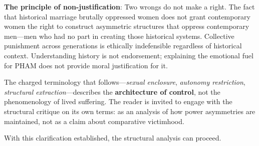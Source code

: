 \documentclass[12pt, letterpaper]{article}
\begin{document}
\textbf{The principle of non-justification}: Two wrongs do not make a right. The fact that historical marriage brutally oppressed women does not grant contemporary women the right to construct asymmetric structures that oppress contemporary men---men who had no part in creating those historical systems. Collective punishment across generations is ethically indefensible regardless of historical context. Understanding history is not endorsement; explaining the emotional fuel for PHAM does not provide moral justification for it.

The charged terminology that follows---\textit{sexual enclosure}, \textit{autonomy restriction}, \textit{structural extraction}---describes the \textbf{architecture of control}, not the phenomenology of lived suffering. The reader is invited to engage with the structural critique on its own terms: as an analysis of how power asymmetries are maintained, not as a claim about comparative victimhood.

With this clarification established, the structural analysis can proceed.
\end{document}
